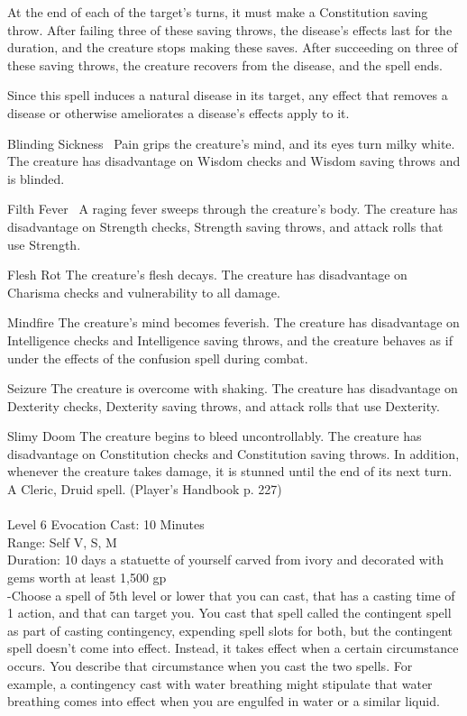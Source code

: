\documentclass[10pt,twocolumn]{report}
\begin{document}
At the end of each of the target’s turns, it must make a Constitution saving throw. After failing three of these saving throws, the disease’s effects last for the duration, and the creature stops making these saves. After succeeding on three of these saving throws, the creature recovers from the disease, and the spell ends. 

Since this spell induces a natural disease in its target, any effect that removes a disease or otherwise ameliorates a disease’s effects apply to it. 

Blinding Sickness 
Pain grips the creature’s mind, and its eyes turn milky white. The creature has disadvantage on Wisdom checks and Wisdom saving throws and is blinded. 

Filth Fever 
A raging fever sweeps through the creature’s body. The creature has disadvantage on Strength checks, Strength saving throws, and attack rolls that use Strength. 

Flesh Rot
The creature’s flesh decays. The creature has disadvantage on Charisma checks and vulnerability to all damage. 

Mindfire 
The creature’s mind becomes feverish. The creature has disadvantage on Intelligence checks and Intelligence saving throws, and the creature behaves as if under the effects of the confusion spell during combat. 

Seizure 
The creature is overcome with shaking. The creature has disadvantage on Dexterity checks, Dexterity saving throws, and attack rolls that use Dexterity. 

Slimy Doom 
The creature begins to bleed uncontrollably. The creature has disadvantage on Constitution checks and Constitution saving throws. In addition, whenever the creature takes damage, it is stunned until the end of its next turn.\\
A Cleric, Druid spell. (Player's Handbook p. 227) \\


 \\
Level 6 \quad Evocation \quad Cast: 10 Minutes\\
Range: Self \quad V, S, M \\
Duration: 10 days \quad a statuette of yourself carved from ivory and decorated with gems worth at least 1,500 gp\\
-Choose a spell of 5th level or lower that you can cast, that has a casting time of 1 action, and that can target you. 
You cast that spell called the contingent spell as part of casting contingency, expending spell slots for both, but the contingent spell doesn’t come into effect. Instead, it takes effect when a certain circumstance occurs. You describe that circumstance when you cast the two spells. For example, a contingency cast with water breathing might stipulate that water breathing comes into effect when you are engulfed in water or a similar liquid. 
\end{document}
